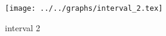 \begin{figure}[h] \centering\texttt{[image: ../../graphs/interval\_2.tex]}\caption{interval 2}\label{gr:interval_2} \end{figure}
